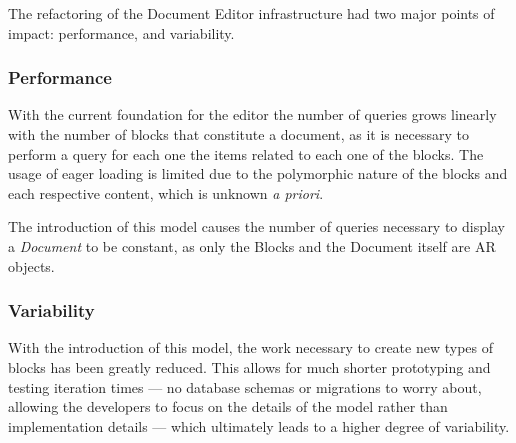 The refactoring of the Document Editor infrastructure had two major points of impact: performance, and variability.


\subsubsection{Performance}

With the current foundation for the editor the number of queries grows linearly with the number of blocks that constitute a document, as it is necessary to perform a query for each one the items related to each one of the blocks. The usage of eager loading is limited due to the polymorphic nature of the blocks and each respective content, which is unknown \emph{a priori}.

The introduction of this model causes the number of queries necessary to display a \emph{Document} to be constant, as only the Blocks and the Document itself are AR objects.

\subsubsection{Variability}

With the introduction of this model, the work necessary to create new types of blocks has been greatly reduced. This allows for much shorter prototyping and testing iteration times --- no database schemas or migrations to worry about, allowing the developers to focus on the details of the model rather than implementation details --- which ultimately leads to a higher degree of variability.









